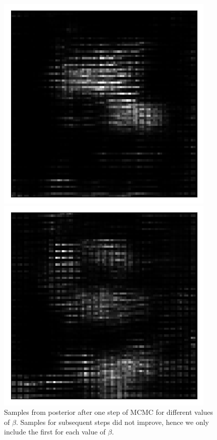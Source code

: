 \begin{figure}[h!]
\begin{multicols}{4}
    \includegraphics[scale=0.4]{figures/results/latent_image/beta_2_posterior_sample_0.png}
    \caption{$\beta=2$}
    \includegraphics[scale=0.4]{figures/results/latent_image/beta_4_posterior_sample_0.png}
    \caption{$\beta=4$}
\end{multicols}
\caption{Samples from posterior after one step of MCMC for different values of $\beta$. Samples for subsequent steps did not improve, hence we only include the first for each value of $\beta$.}
\label{fig:latent_image_originals_posterior_samples}
\end{figure}


